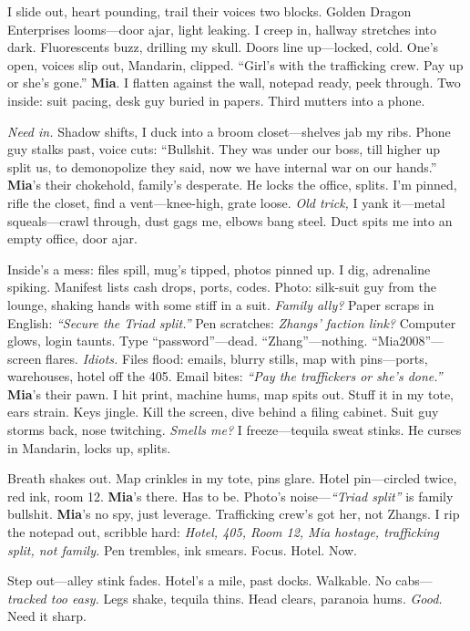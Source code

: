\documentclass{article}
\begin{document}
I slide out, heart pounding, trail their voices two blocks. Golden Dragon Enterprises looms—door ajar, light leaking. I creep in, hallway stretches into dark. Fluorescents buzz, drilling my skull. Doors line up—locked, cold. One’s open, voices slip out, Mandarin, clipped. “Girl’s with the trafficking crew. Pay up or she’s gone.” \textbf{Mia}. I flatten against the wall, notepad ready, peek through. Two inside: suit pacing, desk guy buried in papers. Third mutters into a phone.

\textit{Need in.} Shadow shifts, I duck into a broom closet—shelves jab my ribs. Phone guy stalks past, voice cuts: “Bullshit. They was under our boss, till higher up split us, to demonopolize they said, now we have internal war on our hands.” \textbf{Mia}’s their chokehold, family’s desperate. He locks the office, splits. I’m pinned, rifle the closet, find a vent—knee-high, grate loose. \textit{Old trick,} I yank it—metal squeals—crawl through, dust gags me, elbows bang steel. Duct spits me into an empty office, door ajar.

Inside’s a mess: files spill, mug’s tipped, photos pinned up. I dig, adrenaline spiking. Manifest lists cash drops, ports, codes. Photo: silk-suit guy from the lounge, shaking hands with some stiff in a suit. \textit{Family ally?} Paper scraps in English: \textit{“Secure the Triad split.”} Pen scratches: \textit{Zhangs’ faction link?} Computer glows, login taunts. Type “password”—dead. “Zhang”—nothing. “Mia2008”—screen flares. \textit{Idiots.} Files flood: emails, blurry stills, map with pins—ports, warehouses, hotel off the 405. Email bites: \textit{“Pay the traffickers or she’s done.”} \textbf{Mia}’s their pawn. I hit print, machine hums, map spits out. Stuff it in my tote, ears strain. Keys jingle. Kill the screen, dive behind a filing cabinet. Suit guy storms back, nose twitching. \textit{Smells me?} I freeze—tequila sweat stinks. He curses in Mandarin, locks up, splits.

Breath shakes out. Map crinkles in my tote, pins glare. Hotel pin—circled twice, red ink, room 12. \textbf{Mia}’s there. Has to be. Photo’s noise—\textit{“Triad split”} is family bullshit. \textbf{Mia}’s no spy, just leverage. Trafficking crew’s got her, not Zhangs. I rip the notepad out, scribble hard: \textit{Hotel, 405, Room 12, Mia hostage, trafficking split, not family.} Pen trembles, ink smears. Focus. Hotel. Now.

Step out—alley stink fades. Hotel’s a mile, past docks. Walkable. No cabs—\textit{tracked too easy.} Legs shake, tequila thins. Head clears, paranoia hums. \textit{Good.} Need it sharp.
\end{document}
